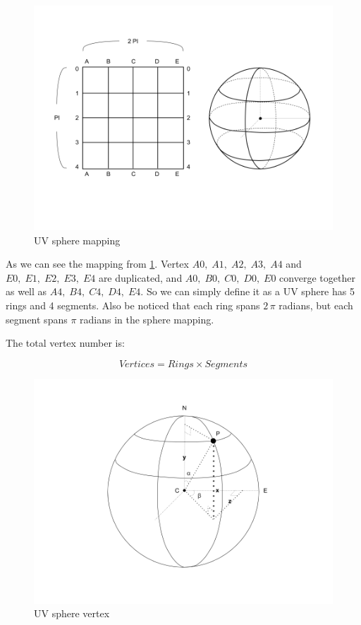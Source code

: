 \begin{figure}[H]
\caption[uv-sphere-mapping]{UV sphere mapping}
\label{fig:uv-sphere-mapping}
\centering
\includegraphics[width=\linewidth]{Figures/uv-sphere-mapping.png}
\decoRule
\end{figure}

As we can see the mapping from \ref{fig:uv-sphere-mapping}. Vertex $A0,\;A1,\;A2,\;A3,\;A4$ and $E0,\;E1,\;E2,\;E3,\;E4$ are duplicated, and $A0,\;B0,\;C0,\;D0,\;E0$ converge together as well as $A4,\;B4,\;C4,\;D4,\;E4$. So we can simply define it as a UV sphere has 5 rings and 4 segments. Also be noticed that each ring spans $2\,\pi$ radians, but each segment spans $\pi$ radians in the sphere mapping.

The total vertex number is:

\begin{equation}
\label{equ:uv-sphere-vertices}
Vertices = Rings \times Segments
\end{equation}

\begin{figure}[H]
\caption[uv-sphere-vertex]{UV sphere vertex}
\label{fig:uv-sphere-vertex}
\centering
\includegraphics[width=\linewidth]{Figures/uv-sphere-vertex.png}
\decoRule
\end{figure}

